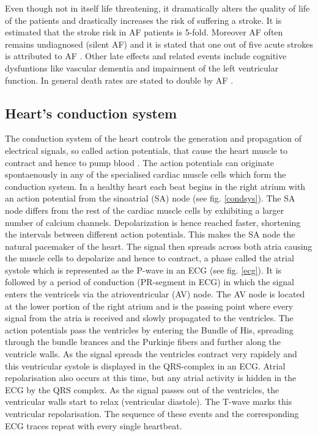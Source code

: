 \documentclass[type=dr, dr=rernat, accentcolor=tud7b,colorbacktitle, bigchapter, openright, twoside, 12pt ]{tudthesis}
\begin{document}
Even though not in itself life threatening, it dramatically alters the quality of life of the patients and drastically increases the risk of suffering a stroke. It is estimated that the stroke risk in AF patients is 5-fold. Moreover AF often remains undiagnosed (silent AF) and it is stated that one out of five acute strokes is attributed to AF \cite{ESC10}. Other late effects and related events include cognitive dysfuntions like vascular dementia and impairment of the left ventricular function. In general death rates are stated to double by AF \cite{ESC10}.\newline



\subsection*{Heart's conduction system}

The conduction system of the heart controls the generation and propagation of electrical signals, so called action potentials, that cause the heart muscle to contract and hence to pump blood \cite{Med}. The action potentials can originate spontaenously in any of the specialised cardiac muscle cells which form the conduction system. In a healthy heart each beat begins in the right atrium with an action potential from the sinoatrial (SA) node (see fig. \ref{condsys}). The SA node differs from the rest of the cardiac muscle cells by exhibiting a larger number of calcium channels. Depolarization is hence reached faster, shortening the intervals between different action potentials. This makes the SA node the natural pacemaker of the heart.
The signal then spreads across both atria causing the muscle cells to depolarize and hence to contract, a phase called the atrial systole which is represented as the P-wave in an ECG (see fig. \ref{ecg}). It is followed by a period of conduction (PR-segment in ECG) in which the signal enters the ventricels via the atrioventricular (AV) node. The AV node is located at the lower portion of the right atrium and is the passing point where every signal from the atria is received and slowly propagated to the ventricles. The action potentials pass the ventricles 
by entering the Bundle of His, spreading through the bundle brances and the Purkinje fibers and further along the ventricle walls. As the signal spreads the ventricles contract very rapidely and this ventricular systole is displayed in the QRS-complex in an ECG. Atrial repolarisation also occurs at this time, but any atrial activity is hidden in the ECG by the QRS complex. As the signal passes out of the ventricles, the ventricular walls start to relax (ventricular diastole). The T-wave marks this ventricular repolarisation. The sequence of these events and the corresponding ECG traces repeat with every single heartbeat.\newline
\end{document}
